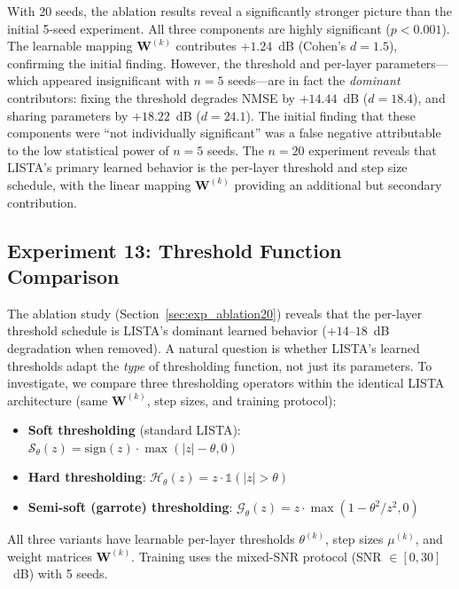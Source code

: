 \documentclass[a4paper,fleqn]{cas-sc}
\begin{document}
With 20 seeds, the ablation results reveal a significantly stronger picture than the initial 5-seed experiment. All three components are highly significant ($p < 0.001$). The learnable mapping $\mathbf{W}^{(k)}$ contributes $+1.24$~dB (Cohen's $d = 1.5$), confirming the initial finding. However, the threshold and per-layer parameters---which appeared insignificant with $n=5$ seeds---are in fact the \emph{dominant} contributors: fixing the threshold degrades NMSE by $+14.44$~dB ($d = 18.4$), and sharing parameters by $+18.22$~dB ($d = 24.1$). The initial finding that these components were ``not individually significant'' was a false negative attributable to the low statistical power of $n=5$ seeds. The $n=20$ experiment reveals that LISTA's primary learned behavior is the per-layer threshold and step size schedule, with the linear mapping $\mathbf{W}^{(k)}$ providing an additional but secondary contribution.

\subsection{Experiment 13: Threshold Function Comparison}\label{sec:exp_threshold}

The ablation study (Section~\ref{sec:exp_ablation20}) reveals that the per-layer threshold schedule is LISTA's dominant learned behavior ($+14$--$18$~dB degradation when removed). A natural question is whether LISTA's learned thresholds adapt the \emph{type} of thresholding function, not just its parameters. To investigate, we compare three thresholding operators within the identical LISTA architecture (same $\mathbf{W}^{(k)}$, step sizes, and training protocol):

\begin{itemize}
\item \textbf{Soft thresholding} (standard LISTA): $\mathcal{S}_\theta(z) = \text{sign}(z) \cdot \max(|z| - \theta, 0)$
\item \textbf{Hard thresholding}: $\mathcal{H}_\theta(z) = z \cdot \mathbb{1}(|z| > \theta)$
\item \textbf{Semi-soft (garrote) thresholding}: $\mathcal{G}_\theta(z) = z \cdot \max(1 - \theta^2/z^2, 0)$
\end{itemize}

All three variants have learnable per-layer thresholds $\theta^{(k)}$, step sizes $\mu^{(k)}$, and weight matrices $\mathbf{W}^{(k)}$. Training uses the mixed-SNR protocol (SNR $\in [0, 30]$~dB) with 5 seeds.
\end{document}
